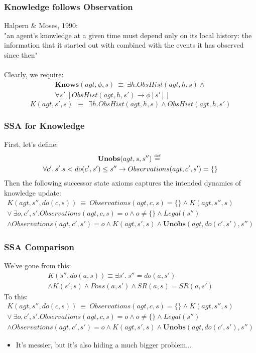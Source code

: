 \documentclass{beamer}
\newcommand{\isdef}{\hbox{$\stackrel{\mbox{\tiny def}}{=}$}}
\begin{document}
\begin{frame}
\frametitle{Knowledge follows  Observation}
Halpern \& Moses, 1990:\\
"an agent's knowledge at a given time must depend only on its local history:
the information that it started out with combined with the events it has
observed since then"
\pause
\ \\
\ \\
Clearly, we require:
\begin{multline*}
\mathbf{Knows}(agt,\phi,s)\ \equiv\ \exists h . ObsHist(agt,h,s) \wedge \\
    \forall s' . \left[ObsHist(agt,h,s') \rightarrow \phi[s']\right]
\end{multline*}
\pause
\begin{equation*}
K(agt,s',s)\ \ \equiv\ \ \exists h . ObsHist(agt,h,s) \wedge ObsHist(agt,h,s')
\end{equation*}
\end{frame}

\begin{frame}
\frametitle{SSA for Knowledge}
First, let's define:
\begin{multline*}
  \mathbf{Unobs}(agt,s,s'')\ \isdef\ \\
    \forall c',s' . s < do(c',s') \leq s'' \rightarrow Observations(agt,c',s') = \{\}
\end{multline*}
\pause
Then the following successor state axioms captures the intended dynamics of
knowledge update:
\begin{multline*}
  K(agt,s'',do(c,s))\ \equiv\ Observations(agt,c,s) = \{\} \wedge K(agt,s'',s)\\
  \vee\ \exists o,c',s'.Observations(agt,c,s) = o \wedge o  \neq \{\} \wedge Legal(s'') \\
  \wedge Observations(agt,c',s')= o \wedge K(agt,s',s) \wedge \mathbf{Unobs}(agt,do(c',s'),s'')
\end{multline*}
\end{frame}

\begin{frame}
\frametitle{SSA Comparison}
We've gone from this:
\begin{multline*}
 K(s'',do(a,s)) \equiv \exists s' . \ s''=do(a,s') \\
 \wedge K(s',s) \wedge Poss(a,s') \wedge SR(a,s) = SR(a,s')
\end{multline*}
\pause
To this:
\begin{multline*}
  K(agt,s'',do(c,s))\ \equiv\ Observations(agt,c,s) = \{\} \wedge K(agt,s'',s)\\
  \vee\ \exists o,c',s'.Observations(agt,c,s) = o \wedge o  \neq \{\} \wedge Legal(s'') \\
  \wedge Observations(agt,c',s')= o \wedge K(agt,s',s) \wedge \mathbf{Unobs}(agt,do(c',s'),s'')
\end{multline*}
\pause
\begin{itemize}
\item It's messier, but it's also hiding a much bigger problem...
\end{itemize}
\end{frame}
\end{document}
